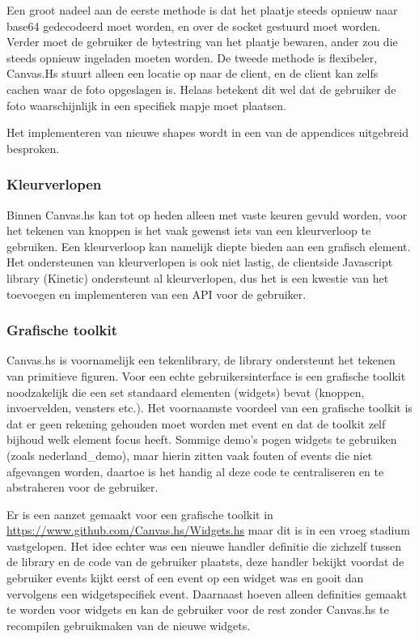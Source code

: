 Een groot nadeel aan de eerste methode is dat het plaatje steeds opnieuw naar base64 gedecodeerd moet worden, en over de socket gestuurd moet worden. Verder moet de gebruiker de bytestring van het plaatje bewaren, ander zou die steeds opnieuw ingeladen moeten worden. De tweede methode is flexibeler, Canvas.Hs stuurt alleen een locatie op naar de client, en de client kan zelfs cachen waar de foto opgeslagen is. Helaas betekent dit wel dat de gebruiker de foto waarschijnlijk in een specifiek mapje moet plaatsen.

Het implementeren van nieuwe shapes wordt in een van de appendices uitgebreid besproken.

\subsubsection{Kleurverlopen}
Binnen Canvas.hs kan tot op heden alleen met vaste keuren gevuld worden, voor het tekenen van knoppen is het vaak gewenst iets van een kleurverloop te gebruiken. Een kleurverloop kan namelijk diepte bieden aan een grafisch element. Het ondersteunen van kleurverlopen is ook niet lastig, de clientside Javascript library (Kinetic) ondersteunt al kleurverlopen, dus het is een kwestie van het toevoegen en implementeren van een API voor de gebruiker.

\subsubsection{Grafische toolkit}
Canvas.hs is voornamelijk een tekenlibrary, de library ondersteunt het tekenen van primitieve figuren. Voor een echte gebruikersinterface is een grafische toolkit noodzakelijk die een set standaard elementen (widgets) bevat (knoppen, invoervelden, vensters etc.). Het voornaamste voordeel van een grafische toolkit is dat er geen rekening gehouden moet worden met event en dat de toolkit zelf bijhoud welk element focus heeft. Sommige demo's pogen widgets te gebruiken (zoals nederland\_demo), maar hierin zitten vaak fouten of events die niet afgevangen worden, daartoe is het handig al deze code te centraliseren en te abstraheren voor de gebruiker.

Er is een aanzet gemaakt voor een grafische toolkit in \url{https://www.github.com/Canvas.hs/Widgets.hs} maar dit is in een vroeg stadium vastgelopen. Het idee echter was een nieuwe handler definitie die zichzelf tussen de library en de code van de gebruiker plaatsts, deze handler bekijkt voordat de gebruiker events kijkt eerst of een event op een widget was en gooit dan vervolgens een widgetspecifiek event. Daarnaast hoeven alleen definities gemaakt te worden voor widgets en kan de gebruiker voor de rest zonder Canvas.hs te recompilen gebruikmaken van de nieuwe widgets.

